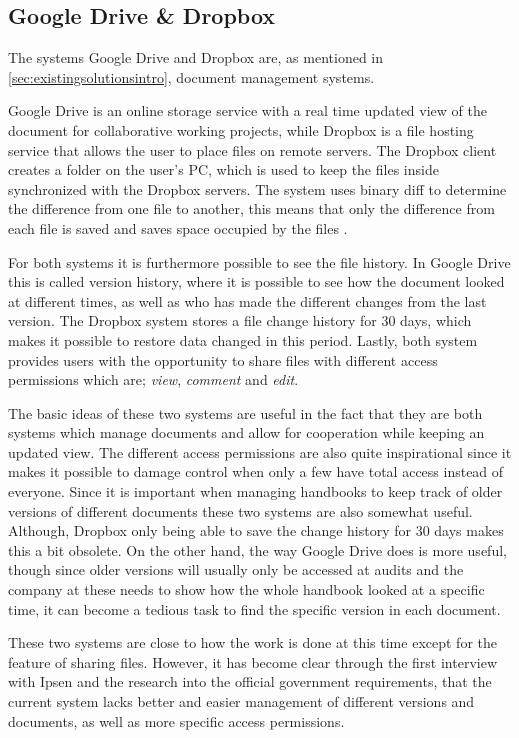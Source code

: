 \subsection{Google Drive \& Dropbox}\label{sec:DropDrive}
The systems Google Drive and Dropbox are, as mentioned in \cref{sec:existingsolutionsintro}, document management systems.

Google Drive is an online storage service with a real time updated view of the document for collaborative working projects\cite{GoogleDriveContents}, while Dropbox is a file hosting service that allows the user to place files on remote servers.
The Dropbox client creates a folder on the user's PC, which is used to keep the files inside synchronized with the Dropbox servers.
The system uses binary diff to determine the difference from one file to another, this means that only the difference from each file is saved and saves space occupied by the files \cite{DropboxDiff}.

For both systems it is furthermore possible to see the file history.
In Google Drive this is called version history, where it is possible to see how the document looked at different times, as well as who has made the different changes from the last version.
The Dropbox system stores a file change history for 30 days, which makes it possible to restore data changed in this period. Lastly, both system provides users with the opportunity to share files with different access permissions which are; \textit{view}, \textit{comment} and \textit{edit}.\cite{DropboxContents}\cite{GoogleDriveContents} 

The basic ideas of these two systems are useful in the fact that they are both systems which manage documents and allow for cooperation while keeping an updated view.
The different access permissions are also quite inspirational since it makes it possible to damage control when only a few have total access instead of everyone.
Since it is important when managing handbooks to keep track of older versions of different documents these two systems are also somewhat useful.
Although, Dropbox only being able to save the change history for 30 days makes this a bit obsolete.
On the other hand, the way Google Drive does is more useful, though since older versions will usually only be accessed at audits and the company at these needs to show how the whole handbook looked at a specific time, it can become a tedious task to find the specific version in each document.\cite{DropboxContents}\cite{GoogleDriveContents}

These two systems are close to how the work is done at this time except for the feature of sharing files.
However, it has become clear through the first interview with Ipsen and the research into the official government requirements, that the current system lacks better and easier management of different versions and documents, as well as more specific access permissions.
